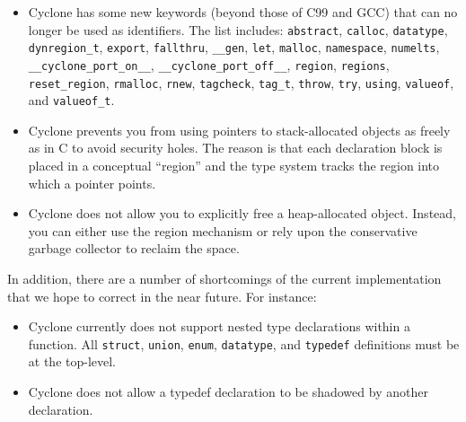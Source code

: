 \begin{itemize}

\item Cyclone has some new keywords (beyond those of C99 and GCC)
  that can no longer be used as identifiers.  The list includes:
  \texttt{abstract}, \texttt{calloc}, \texttt{datatype},
  \texttt{dynregion_t}, \texttt{export}, \texttt{fallthru}, 
  \texttt{__gen}, \texttt{let}, \texttt{malloc}, \texttt{namespace},
  \texttt{numelts}, \texttt{__cyclone_port_on__}, 
  \texttt{__cyclone_port_off__}, \texttt{region}, \texttt{regions},
  \texttt{reset_region}, \texttt{rmalloc}, \texttt{rnew}, \texttt{tagcheck},
  \texttt{tag_t}, \texttt{throw}, \texttt{try}, \texttt{using},
  \texttt{valueof}, and \texttt{valueof_t}.

\item Cyclone prevents you from using pointers to stack-allocated
  objects as freely as in C to avoid security holes. The reason is
  that each declaration block is placed in a conceptual ``region'' and
  the type system tracks the region into which a pointer points.

\item Cyclone does not allow you to explicitly free a heap-allocated
  object. Instead, you can either use the region mechanism or rely
  upon the conservative garbage collector to reclaim the space.

\end{itemize}

In addition, there are a number of shortcomings of the current
implementation that we hope to correct in the near future.  For
instance:
\begin{itemize}
\item Cyclone currently does not support nested type declarations
  within a function. All \texttt{struct}, \texttt{union}, \texttt{enum},
  \texttt{datatype}, and \texttt{typedef} definitions must
  be at the top-level.

\item Cyclone does not allow a typedef declaration to be shadowed by
another declaration.
\end{itemize}


